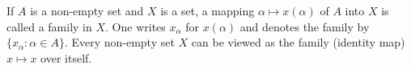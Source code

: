 If $A$ is a non-empty set and $X$ is a set, a mapping $\alpha \mapsto x(\alpha)$ of $A$ into $X$ is called a family in $X$. One writes $x_\alpha$ for $x(\alpha)$ and denotes the family by $\{x_\alpha : \alpha \in A\}$. Every non-empty set $X$ can be viewed as the family (identity map) $x \mapsto x$ over itself.
